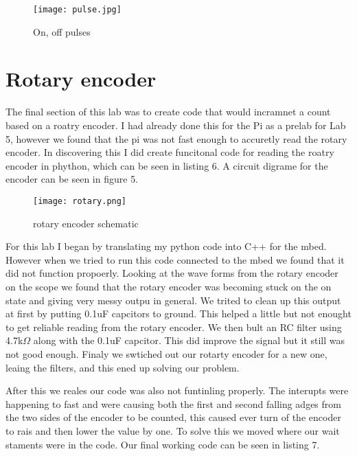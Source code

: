 \documentclass[prl,12pt,notitlepage,aps,onecolumn,superscriptaddress]{revtex4-1}
\newcommand{\ohm}{$\Omega$ }
\begin{document}
\begin{figure}[h]
\begin{center}
\texttt{[image: pulse.jpg]}
\end{center}
\caption{\label{fig:pic} On, off pulses}
\end{figure}

\section{Rotary encoder}
The final section of this lab was to create code that would incramnet a count based on a roatry encoder. I had already done this for the Pi as a prelab for Lab 5, however we found that the pi was not fast enough to accuretly read the rotary encoder. In discovering this I did create funcitonal code for reading the roatry encoder in phython, which can be seen in listing 6. A circuit digrame for the encoder can be seen in figure 5.

\begin{figure}[h]
\begin{center}
\texttt{[image: rotary.png]}
\end{center}
\caption{\label{fig:pic} rotary encoder schematic}
\end{figure}

For this lab I began by translating my python code into C++ for the mbed. However when we tried to run this code connected to the mbed we found that it did not function propoerly. Looking at the wave forms from the rotary encoder on the scope we found that the rotary encoder was becoming stuck on the on state and giving very messy outpu in general. We trited to clean up this output at first by putting 0.1uF capcitors to ground. This helped a little but not enought to get reliable reading from the rotary encoder. We then bult an RC filter using 4.7k\ohm along with the 0.1uF capcitor. This did improve the signal but it still was not good enough. Finaly we swtiched out our rotarty encoder for a new one, leaing the filters, and this ened up solving our problem.

After this we reales our code was also not funtinling properly. The interupts were happening to fast and were causing both the first and second falling adges from the two sides of the encoder to be counted, this caused ever turn of the encoder to rais and then lower the value by one. To solve this we moved where our wait staments were in the code. Our final working code can be seen in listing 7.
\end{document}
